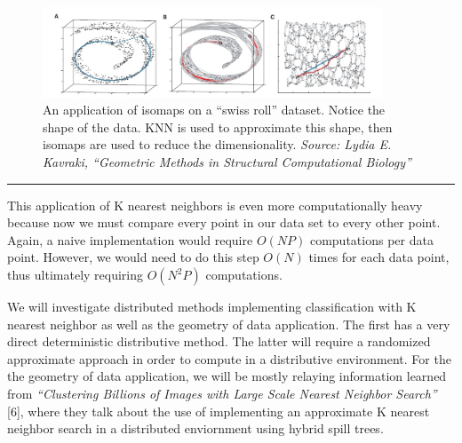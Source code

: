 \begin{figure}[ht!]
\centering
\includegraphics[width=0.9\textwidth]{manifold}
\caption{An application of isomaps on a ``swiss roll'' dataset. Notice
the shape of the data. KNN is used to approximate this shape, then isomaps are used 
to reduce the dimensionality. \textit{Source: Lydia E. Kavraki, ``Geometric Methods 
in Structural Computational Biology''}}
\end{figure}

\noindent\rule{12.1cm}{0.4pt}

\vspace{5 mm}
\noindent
This application of K nearest neighbors is even more computationally heavy 
because now we must compare every point in our data set to every other point. 
Again, a naive implementation would require $O(NP)$ computations per data 
point. However, we would need to do this step $O(N)$ times for each data point, 
thus ultimately requiring $O(N^{2}P)$ computations.

\vspace{5 mm}
\noindent
We will investigate distributed methods implementing classification with 
K nearest neighbor as well as the geometry of data application. The 
first has a very direct deterministic distributive method. The latter will 
require a randomized approximate approach in order to compute in a distributive 
environment. For the the geometry of data application, we will be mostly 
relaying information learned from \textit{``Clustering Billions of Images with 
Large Scale Nearest Neighbor Search''} [6], where they talk about the use of 
implementing an approximate K nearest neighbor search in a distributed enviornment
using hybrid spill trees.
